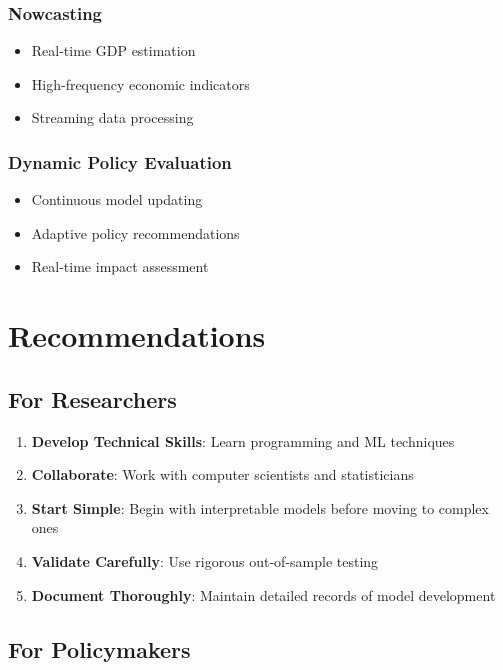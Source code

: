 \documentclass[12pt,a4paper]{article}
\begin{document}
{\subsubsection{Nowcasting}
\begin{itemize}
    \item Real-time GDP estimation
    \item High-frequency economic indicators
    \item Streaming data processing
\end{itemize}

\subsubsection{Dynamic Policy Evaluation}
\begin{itemize}
    \item Continuous model updating
    \item Adaptive policy recommendations
    \item Real-time impact assessment
\end{itemize}

\section{Recommendations}

\subsection{For Researchers}

\begin{enumerate}
    \item \textbf{Develop Technical Skills}: Learn programming and ML techniques
    \item \textbf{Collaborate}: Work with computer scientists and statisticians
    \item \textbf{Start Simple}: Begin with interpretable models before moving to complex ones
    \item \textbf{Validate Carefully}: Use rigorous out-of-sample testing
    \item \textbf{Document Thoroughly}: Maintain detailed records of model development
\end{enumerate}

\subsection{For Policymakers}

}
\end{document}
